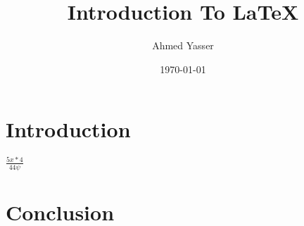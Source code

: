 \documentclass[options]{article}
\title{Introduction To LaTeX}
\author{Ahmed Yasser}
\date{\today}
\begin{document}
\maketitle

\section{Introduction}

$ \frac{5x*4}{44\psi} $

\section{Conclusion}
\end{document}
